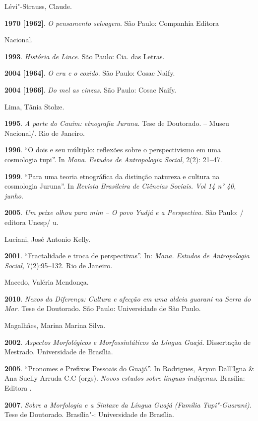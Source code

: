 Lévi"-Strauss, Claude.

\textbf{1970 {[}1962{]}}. \emph{O pensamento selvagem}. São Paulo:
Companhia Editora

Nacional.

\textbf{1993}. \emph{História de Lince}. São Paulo: Cia. das Letras.

\textbf{2004 {[}1964{]}}. \emph{O cru e o cozido}. São Paulo: Cosac
Naify.

\textbf{2004 {[}1966{]}}. \emph{Do mel as cinzas}. São Paulo: Cosac
Naify.

Lima, Tânia Stolze.

\textbf{1995}. \emph{A parte do Cauim: etnografia Juruna}. Tese de
Doutorado.  -- Museu Nacional/. Rio de Janeiro.

\textbf{1996}. ``O dois e seu múltiplo: reflexões sobre o perspectivismo
em uma cosmologia tupi''. In \emph{Mana}. \emph{Estudos de Antropologia
Social}, 2(2): 21--47.

\textbf{1999}. ``Para uma teoria etnográfica da distinção natureza e
cultura na cosmologia Juruna''. In \emph{Revista Brasileira de Ciências
Sociais. Vol 14 n° 40, junho}.

\textbf{2005}. \emph{Um peixe olhou para mim -- O povo Yudjá e a
Perspectiva}. São Paulo: / editora Unesp/ u.

Luciani, José Antonio Kelly.

\textbf{2001}. ``Fractalidade e troca de perspectivas''. In: \emph{Mana.
Estudos de Antropologia Social,} 7(2):95--132. Rio de Janeiro.

Macedo, Valéria Mendonça.

\textbf{2010}. \emph{Nexos da Diferença: Cultura e afecção em uma aldeia
guarani na Serra do Mar}. Tese de Doutorado. São Paulo: Universidade de
São Paulo.

Magalhães, Marina Marina Silva.

\textbf{2002}. \emph{Aspectos Morfológicos e Morfossintáticos da Língua
Guajá}. Dissertação de Mestrado. Universidade de Brasília.

\textbf{2005}. ``Pronomes e Prefixos Pessoais do Guajá''. In Rodrigues,
Aryon Dall'Igna \& Ana Suelly Arruda C.C (orgs). \emph{Novos estudos
sobre línguas indígenas}. Brasília: Editora .

\textbf{2007}. \emph{Sobre a Morfologia e a Sintaxe da Língua Guajá
(Família Tupi"-Guarani)}. Tese de Doutorado. Brasília"-: Universidade de
Brasília.

